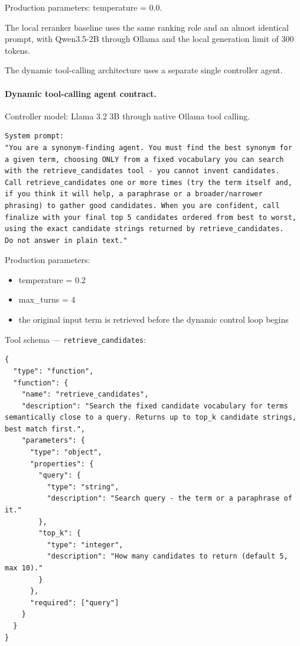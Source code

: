 Production parameters: temperature = 0.0.

The local reranker baseline uses the same ranking role and an almost identical prompt, with Qwen3.5-2B through Ollama and the local generation limit of 300 tokens.

The dynamic tool-calling architecture uses a separate single controller agent.

\paragraph{Dynamic tool-calling agent contract.}
Controller model: Llama 3.2 3B through native Ollama tool calling.

\begin{lstlisting}[style=promptstyle]
System prompt:
"You are a synonym-finding agent. You must find the best synonym for
a given term, choosing ONLY from a fixed vocabulary you can search
with the retrieve_candidates tool - you cannot invent candidates.
Call retrieve_candidates one or more times (try the term itself and,
if you think it will help, a paraphrase or a broader/narrower
phrasing) to gather good candidates. When you are confident, call
finalize with your final top 5 candidates ordered from best to worst,
using the exact candidate strings returned by retrieve_candidates.
Do not answer in plain text."
\end{lstlisting}

Production parameters:
\begin{itemize}
  \item temperature = 0.2
  \item max\_turns = 4
  \item the original input term is retrieved before the dynamic control loop begins
\end{itemize}

Tool schema --- \texttt{retrieve\_candidates}:

\begin{lstlisting}[style=jsonstyle]
{
  "type": "function",
  "function": {
    "name": "retrieve_candidates",
    "description": "Search the fixed candidate vocabulary for terms semantically close to a query. Returns up to top_k candidate strings, best match first.",
    "parameters": {
      "type": "object",
      "properties": {
        "query": {
          "type": "string",
          "description": "Search query - the term or a paraphrase of it."
        },
        "top_k": {
          "type": "integer",
          "description": "How many candidates to return (default 5, max 10)."
        }
      },
      "required": ["query"]
    }
  }
}
\end{lstlisting}

